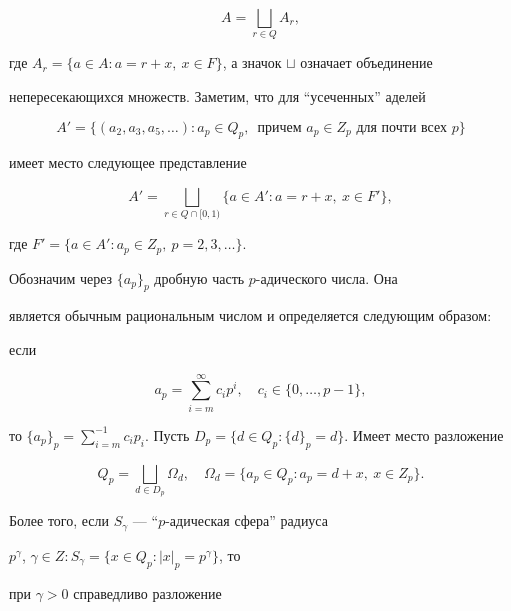 \begin{equation} 


A=\bigsqcup\limits_{r\in Q}A_r,


\end{equation} 


где $A_r=\{a\in A:a=r+x,\ x\in F\}$, а значок $\sqcup$ означает объединение 


непересекающихся множеств. Заметим, что для ``усеченных'' аделей 


$$ 


A'=\{(a_2,a_3,a_5,\dotsc):a_p\in Q_p, 


\ \; \text{причем $a_p\in Z_p$ для почти всех $p$}\} 


$$ 


имеет место следующее представление 


\begin{equation} 


A'=\bigsqcup\limits_{r\in Q\cap[0,1)} 


\{a\in A':a=r+x,\ x\in F'\}, 


\end{equation} 


где $F'=\{a\in A':a_p\in Z_p,\ p=2,3,\dotsc\}$. 


 


Обозначим через $\{a_p\}_p$ дробную часть $p$-адического числа. Она 


является обычным рациональным числом и определяется следующим образом: 


если 


$$ 


a_p=\sum^\infty_{i=m}c_i p^i,\quad 


c_i\in\{0,\dotsc,p-1\}, 


$$ 


то $\{a_p\}_p=\sum\limits^{-1}_{i=m}c_i p_i$. Пусть $D_p=\{d\in 


Q_p:\{d\}_p=d\}$. Имеет место разложение 


$$ 


Q_p=\bigsqcup\limits_{d\in D_p}\Omega_d,\quad 


\Omega_d=\{a_p\in Q_p:a_p=d+x,\ x\in Z_p\}. 


$$ 


Более того, если $S_\gamma$ --- ``$p$-адическая сфера'' радиуса 


$p^\gamma$, $\gamma\in Z:S_\gamma=\{x\in Q_p:|x|_p=p^\gamma\}$, то 


при $\gamma>0$ справедливо разложение 



